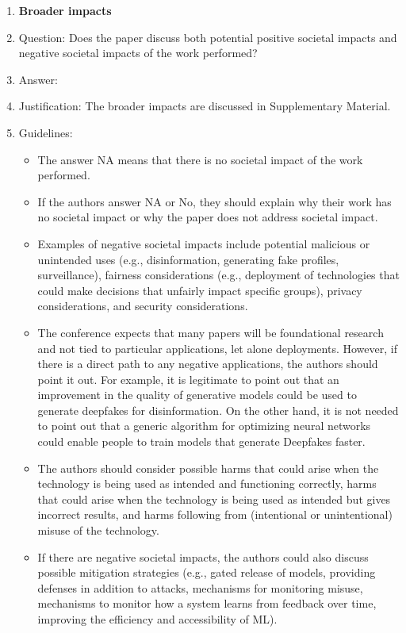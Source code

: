 \documentclass{article}
\begin{document}
\begin{enumerate}
\item {\bf Broader impacts}
    \item[] Question: Does the paper discuss both potential positive societal impacts and negative societal impacts of the work performed?
    \item[] Answer: \answerYes{} %
    \item[] Justification: The broader impacts are discussed in Supplementary Material.
    \item[] Guidelines:
    \begin{itemize}
        \item The answer NA means that there is no societal impact of the work performed.
        \item If the authors answer NA or No, they should explain why their work has no societal impact or why the paper does not address societal impact.
        \item Examples of negative societal impacts include potential malicious or unintended uses (e.g., disinformation, generating fake profiles, surveillance), fairness considerations (e.g., deployment of technologies that could make decisions that unfairly impact specific groups), privacy considerations, and security considerations.
        \item The conference expects that many papers will be foundational research and not tied to particular applications, let alone deployments. However, if there is a direct path to any negative applications, the authors should point it out. For example, it is legitimate to point out that an improvement in the quality of generative models could be used to generate deepfakes for disinformation. On the other hand, it is not needed to point out that a generic algorithm for optimizing neural networks could enable people to train models that generate Deepfakes faster.
        \item The authors should consider possible harms that could arise when the technology is being used as intended and functioning correctly, harms that could arise when the technology is being used as intended but gives incorrect results, and harms following from (intentional or unintentional) misuse of the technology.
        \item If there are negative societal impacts, the authors could also discuss possible mitigation strategies (e.g., gated release of models, providing defenses in addition to attacks, mechanisms for monitoring misuse, mechanisms to monitor how a system learns from feedback over time, improving the efficiency and accessibility of ML).
    \end{itemize}
    

\end{enumerate}
\end{document}
